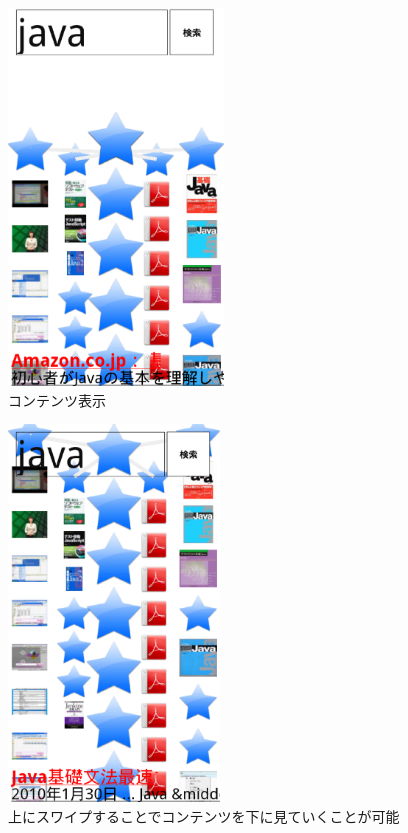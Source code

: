 \begin{figure}[htbp]
\begin{center}
\includegraphics[height=10cm]{eps/le04.eps}
\caption{コンテンツ表示}
\label{le04}
\end{center}
\end{figure}

\begin{figure}[htbp]
\begin{center}
\includegraphics[height=10cm]{eps/le05.eps}
\caption{上にスワイプすることでコンテンツを下に見ていくことが可能}
\label{le05}
\end{center}
\end{figure}

